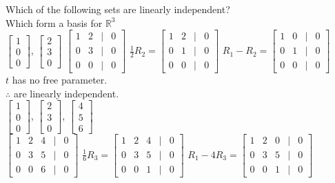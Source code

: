 \documentclass[a4paper]{article}
\begin{document}
Which of the following sets are linearly independent?\\
Which form a basis for $\mathbb{R}^3$\\
$\begin{bmatrix}
1\\
0\\
0
\end{bmatrix}$, $\begin{bmatrix}
2\\
3\\
0
\end{bmatrix}$
$\begin{bmatrix}
1&2&|&0\\
0&3&|&0\\
0&0&|&0
\end{bmatrix}$
$\frac{1}{2}R_2 = \begin{bmatrix}
1&2&|&0\\
0&1&|&0\\
0&0&|&0
\end{bmatrix}$
$R_1 - R_2 = \begin{bmatrix}
1&0&|&0\\
0&1&|&0\\
0&0&|&0
\end{bmatrix}$\\
$t$ has no free parameter.\\
$\therefore$ are linearly independent.\\
$\begin{bmatrix}
1\\
0\\
0
\end{bmatrix}$, $\begin{bmatrix}
2\\
3\\
0
\end{bmatrix}$, $\begin{bmatrix}
4\\
5\\
6
\end{bmatrix}$\\
$\begin{bmatrix}
1&2&4&|&0\\
0&3&5&|&0\\
0&0&6&|&0
\end{bmatrix}$
$\frac{1}{6}R_3 = \begin{bmatrix}
1&2&4&|&0\\
0&3&5&|&0\\
0&0&1&|&0
\end{bmatrix}$
$R_1 - 4R_3 = \begin{bmatrix}
1&2&0&|&0\\
0&3&5&|&0\\
0&0&1&|&0
\end{bmatrix}$
\end{document}
